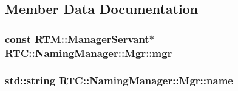 \subsection{Member Data Documentation}
\subsubsection[{mgr}]{\setlength{\rightskip}{0pt plus 5cm}const {\bf RTM::ManagerServant}$\ast$ {\bf RTC::NamingManager::Mgr::mgr}}\label{structRTC_1_1NamingManager_1_1Mgr_a158e27881f87a93e786f0e43726557be}
\subsubsection[{name}]{\setlength{\rightskip}{0pt plus 5cm}std::string {\bf RTC::NamingManager::Mgr::name}}\label{structRTC_1_1NamingManager_1_1Mgr_a4f6f6b186c6852e761efe4ee980fbc98}
